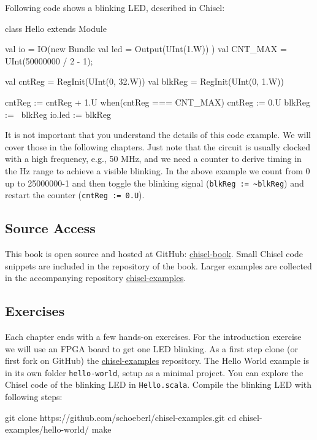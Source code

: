 \documentclass[a4paper]{article}
\newcommand{\code}[1]{{\small{\texttt{#1}}}}
\begin{document}
Following code shows a blinking LED, described in Chisel:

\begin{chisel}
class Hello extends Module {
  val io = IO(new Bundle {
    val led = Output(UInt(1.W))
  })
  val CNT_MAX = UInt(50000000 / 2 - 1);
  
  val cntReg = RegInit(UInt(0, 32.W))
  val blkReg = RegInit(UInt(0, 1.W))

  cntReg := cntReg + 1.U
  when(cntReg === CNT_MAX) {
    cntReg := 0.U
    blkReg := ~blkReg
  }
  io.led := blkReg
}
\end{chisel}

It is not important that you understand the details of this code example.
We will cover those in the following chapters. Just note that the circuit is
usually clocked with a high frequency, e.g., 50 MHz, and we need a counter
to derive timing in the Hz range to achieve a visible blinking. In the above
example we count from 0 up to 25000000-1 and then toggle the blinking signal
(\code{blkReg := \textasciitilde blkReg}) and restart the counter (\code{cntReg := 0.U}).

\subsection{Source Access}

This book is open source and hosted at GitHub: \href{https://github.com/schoeberl/chisel-book}{chisel-book}.
Small Chisel code snippets are included in the repository of the book.
Larger examples are collected in the accompanying repository \href{https://github.com/schoeberl/chisel-examples}{chisel-examples}.

\subsection{Exercises}

Each chapter ends with a few hands-on exercises. For the introduction exercise we will use an
FPGA board to get one LED blinking.
As a first step clone (or first fork on GitHub) the \href{https://github.com/schoeberl/chisel-examples}{chisel-examples}
repository.
The Hello World example is in its own folder \code{hello-world}, setup as
a minimal project. You can explore the Chisel code of the blinking LED
in \code{Hello.scala}.
Compile the blinking LED with following steps:

\begin{chisel}
git clone https://github.com/schoeberl/chisel-examples.git
cd chisel-examples/hello-world/
make
\end{chisel}
\end{document}
